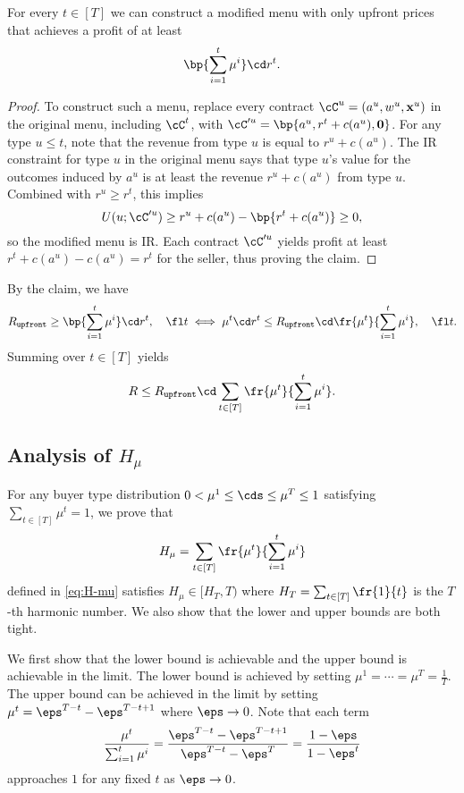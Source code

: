 \begin{enumerate}
        \begin{claim*}
            For every $t\in [T]$ we can construct a modified menu with only upfront prices that achieves a profit of at least $$\bp{\sum_{i=1}^t \mu^i} \cd r^t.$$ 
        \end{claim*}
        \begin{proof}
            To construct such a menu, replace every contract $\cC^u = (a^u, w^u, \mathbf{x}^u)$ in the original menu, including $\cC^t$, with $\cC'^u = \bp{a^u, r^t + c(a^u), \mathbf{0}}$. For any type $u\le t$, note that the revenue from type $u$ is equal to $r^u + c(a^u)$. The IR constraint for type $u$ in the original menu says that type $u$'s value for the outcomes induced by $a^u$ is at least the revenue $r^u + c(a^u)$ from type $u$. Combined with $r^u \ge r^t$, this implies $$U(u; \cC'^u) \ge r^u + c(a^u) - \bp{r^t + c(a^u)} \ge 0,$$
        so the modified menu is IR. Each contract $\cC'^u$ yields profit at least $r^t + c(a^u) - c(a^u) = r^t$ for the seller, thus proving the claim.
        \end{proof}

        By the claim, we have $$\Rupfront \ge \bp{\sum_{i=1}^t \mu^i} \cd r^t,\quad \fl t \iff \mu^t \cd r^t \le \Rupfront \cd \fr{\mu^t}{\sum_{i=1}^t \mu^i},\quad \fl t.$$ Summing over $t\in [T]$ yields $$R \le \Rupfront \cd \sum_{t\in [T]} \fr{\mu^t}{\sum_{i=1}^t \mu^i}.$$
    \end{enumerate}

\subsection{Analysis of $H_\mu$} \label{H_mu}

For any buyer type distribution $0<\mu^1\le \cds \le \mu^T \le 1$ satisfying $\sum_{t\in [T]} \mu^t = 1$, we prove that $$H_\mu = \sum_{t\in [T]} \fr{\mu^t}{\sum_{i=1}^t \mu^i}$$ defined in \cref{eq:H-mu} satisfies $H_\mu \in [H_T, T)$ where $H_T = \sum_{t\in [T]} \fr{1}{t}$ is the $T$-th harmonic number. We also show that the lower and upper bounds are both tight.

    We first show that the lower bound is achievable and the upper bound is achievable in the limit. The lower bound is achieved by setting $\mu^1 = \cdots = \mu^T = \frac{1}{T}$. The upper bound can be achieved in the limit by setting $\mu^t = \eps^{T-t} - \eps^{T-t+ 1}$ where $\eps \to 0$. Note that each term $$\frac{\mu^t}{\sum_{i = 1}^t \mu^i} = \frac{ \eps^{T-t} - \eps^{T-t + 1} }{\eps^{T-t} - \eps^T} = \frac{1 - \eps}{1 - \eps^{t}}$$ approaches $1$ for any fixed $t$ as $\eps\to 0$.

